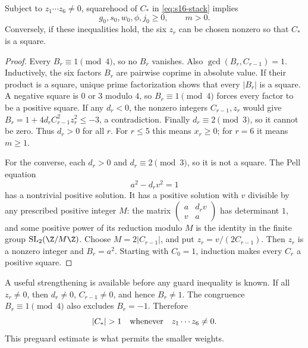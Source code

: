 \begin{lemma}\label{lem:s16-stack}
Subject to \(z_1\cdots z_6\neq0\), squarehood of \(C_*\) in
\eqref{eq:s16-stack} implies
\begin{equation}
 g_0,s_0,w_0,\phi,j_0\geq0,\qquad m>0.
 \label{eq:s16-guards}
\end{equation}
Conversely, if these inequalities hold, the six \(z_r\) can be chosen
nonzero so that \(C_*\) is a square.
\end{lemma}
\begin{proof}
Every \(B_r\equiv1\pmod4\), so no \(B_r\) vanishes.
Also \(\gcd(B_r,C_{r-1})=1\).
Inductively, the six factors \(B_r\) are pairwise coprime in absolute
value.  If their product is a square, unique prime factorization shows
that every \(|B_r|\) is a square.  A negative square is \(0\) or \(3\)
modulo \(4\), so \(B_r\equiv1\pmod4\) forces every factor to be a
positive square.  If any \(d_r<0\), the nonzero integers
\(C_{r-1},z_r\) would give
\(B_r=1+4d_rC_{r-1}^2z_r^2\leq-3\), a contradiction.
Finally \(d_r\equiv2\pmod3\), so it cannot be zero.
Thus \(d_r>0\) for all \(r\).  For \(r\leq5\) this means \(x_r\geq0\);
for \(r=6\) it means \(m\geq1\).

For the converse, each \(d_r>0\) and \(d_r\equiv2\pmod3\), so it is
not a square.  The Pell equation
\[
 a^2-d_r v^2=1
\]
has a nontrivial positive solution.  It has a positive solution with
\(v\) divisible by any prescribed positive integer \(M\): the matrix
\(\left(\begin{smallmatrix}a&d_rv\\v&a\end{smallmatrix}\right)\)
has determinant \(1\), and some positive power of its reduction modulo
\(M\) is the identity in the finite group
\(\mathrm{SL}_2(\Z/M\Z)\).
Choose \(M=2|C_{r-1}|\), and put \(z_r=v/(2C_{r-1})\).
Then \(z_r\) is a nonzero integer and \(B_r=a^2\).
Starting with \(C_0=1\), induction makes every \(C_r\) a positive square.
\end{proof}

A useful strengthening is available before any guard inequality is known.
If all \(z_r\neq0\), then \(d_r\neq0\), \(C_{r-1}\neq0\), and hence
\(B_r\neq1\).  The congruence \(B_r\equiv1\pmod4\) also excludes
\(B_r=-1\).  Therefore
\begin{equation}
 |C_*|>1
 \quad\hbox{whenever}\quad z_1\cdots z_6\neq0.
 \label{eq:s16-stack-large}
\end{equation}
This preguard estimate is what permits the smaller weights.

